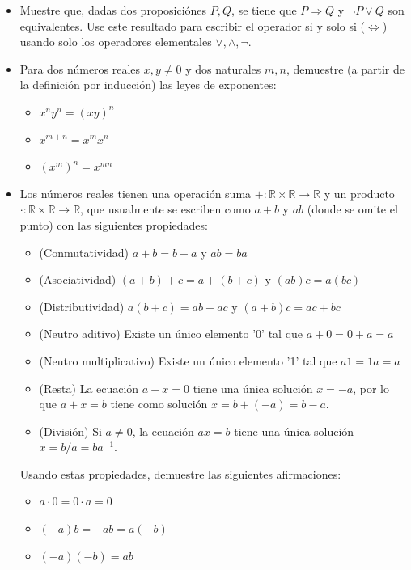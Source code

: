\documentclass{article}
\newcommand{\R}{\mathbb{R}}
\begin{document}
\begin{itemize}
    \item[\bf (1pt)]  Muestre que, dadas dos proposiciónes $P, Q$, se tiene que $P\Rightarrow Q$ y $\neg P \vee Q$ son equivalentes. Use este resultado para escribir el operador si y solo si ($\Leftrightarrow$) usando solo los operadores elementales $\vee,\wedge,\neg$.
    \item Para dos números reales $x,y\neq 0$ y dos naturales $m,n$, demuestre (a partir de la definición por inducción) las leyes de exponentes: 
        \begin{itemize}
            \item[\bf (1pt)] $x^ny^n = (xy)^n$
            \item[\bf (1pt)] $x^{m+n} = x^mx^n$
            \item[\bf (1pt)] $(x^m)^n = x^{mn}$
        \end{itemize}
    \item Los números reales tienen una operación suma $+:\R\times \R\to \R$ y un producto $\cdot: \R\times\R\to \R$, que usualmente se escriben como $a+b$ y $ab$ (donde se omite el punto)  con las siguientes propiedades:
        \begin{itemize}
            \item (Conmutatividad) $a+b=b+a$ y $ab=ba$
            \item (Asociatividad) $(a+b)+c = a+(b+c)$ y $(ab)c = a(bc)$
            \item (Distributividad) $a(b+c) = ab+ac$ y $(a+b)c = ac+bc$
            \item (Neutro aditivo) Existe un único elemento '0' tal que $a+0 = 0+a = a$
            \item (Neutro multiplicativo) Existe un único elemento '1' tal que $a1 = 1a = a$
            \item (Resta) La ecuación $a+x =0$ tiene una única solución $x=-a$, por lo que $a+x = b$ tiene como solución $x = b + (-a) = b-a$.
            \item (División) Si $a\neq 0$, la ecuación $ax=b$ tiene una única solución $x = b/a = ba^{-1}$. 
        \end{itemize}

        Usando estas propiedades, demuestre las siguientes afirmaciones: 
        \begin{itemize}
            \item[\bf (1pt)]  $a \cdot 0 = 0 \cdot a = 0$
            \item[\bf (1pt)] $(-a)b = -ab = a(-b)$
            \item[\bf (1pt)] $(-a)(-b) = ab$
        \end{itemize}


\end{itemize}
\end{document}
